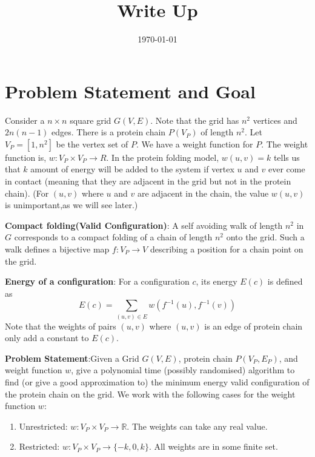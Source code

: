 \documentclass[12pt]{article}
\title{Write Up}
\date{\today}
\theoremstyle{definition}
\theoremstyle{remark}
\begin{document}
\maketitle
\begin{comment}
\begin{abstract}
This is the paper's abstract \ldots
\end{abstract}
\end{comment}

\section{Problem Statement and Goal}

Consider a $n \times n$ square grid $G(V,E)$. Note that the grid has $n^2$ vertices and $2n(n-1)$ edges. There is a protein chain $P(V_P)$ of length $n^2$. Let $V_P = [1,n^2]$ be the vertex set of $P$. We have a weight function for $P$. The weight function is, $w:V_P \times V_P \rightarrow R$. In the protein folding model, $w(u,v) = k$ tells us that $k$ amount of energy will be added to the system if vertex $u$ and $v$ ever come in contact (meaning that they are adjacent in the grid but not in the protein chain). (For $(u,v)$ where $u$ and $v$ are adjacent in the chain, the value $w(u,v)$ is unimportant,as we will see later.) 
 
\textbf{Compact folding(Valid Configuration)}: A self avoiding walk of length $n^2$ in $G$ corresponds to a compact folding of a chain of length $n^2$ onto the grid. Such a walk defines a bijective map $f:V_P \rightarrow V$ describing a position for a chain point on the grid. 

\textbf{Energy of a configuration}: For a configuration $c$, its energy $E(c)$ is defined as 
$$
E(c) = \sum_{(u,v) \in E} w(f^{-1}(u),f^{-1}(v))
$$
Note that the weights of pairs $(u,v)$ where $(u,v)$ is an edge of protein chain only add a constant to $E(c)$.

\textbf{Problem Statement}:Given a Grid $G(V,E)$, protein chain $P(V_P,E_P)$, and weight function $w$, give a polynomial time (possibly randomised) algorithm to find (or give a good approximation to) the minimum energy valid configuration of the protein chain on the grid. We work with the following cases for the weight function $w$:
\newpage
\begin{enumerate}
\item Unrestricted:  $w: V_P \times V_P \rightarrow \mathbb{R}$. The weights can take any real value.
\item Restricted: $w: V_P \times V_P \rightarrow \{-k,0,k\}$. All weights are in some finite set.
\end{enumerate} 
\end{document}
